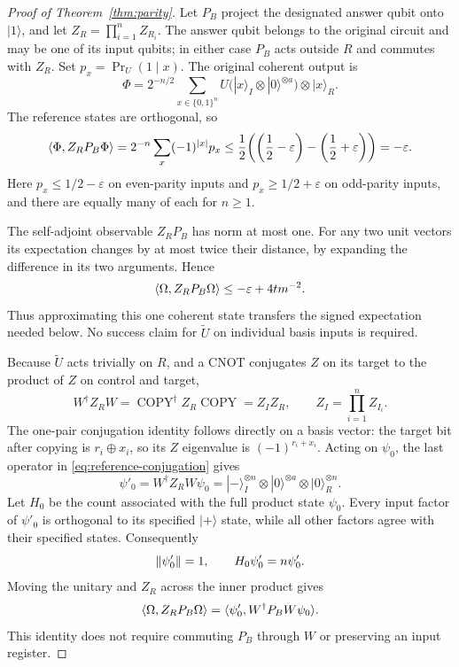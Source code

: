 \begin{proof}[Proof of Theorem~\ref{thm:parity}]
Let $P_B$ project the designated answer qubit onto $|1\rangle$, and
let $Z_R=\prod_{i=1}^n Z_{R_i}$.  The answer qubit belongs to the
original circuit and may be one of its input qubits; in either case
$P_B$ acts outside $R$ and commutes with $Z_R$.  Set
$p_x=\Pr_U(1\mid x)$.  The original coherent output is
\[
 \Phi=2^{-n/2}\sum_{x\in\{0,1\}^n}
        U\bigl(|x\rangle_I\otimes|0\rangle^{\otimes a}\bigr)
        \otimes|x\rangle_R.
\]
The reference states are orthogonal, so
\begin{equation}\label{eq:parity-correlation}
 \langle \Phi,Z_RP_B\Phi\rangle
 =2^{-n}\sum_x(-1)^{|x|}p_x
 \le\frac12\!\left(\left(\frac12-\varepsilon\right)
                  -\left(\frac12+\varepsilon\right)\right)
 =-\varepsilon.
\end{equation}
Here $p_x\le1/2-\varepsilon$ on even-parity inputs and
$p_x\ge1/2+\varepsilon$ on
odd-parity inputs, and there are equally many of each for $n\ge1$.

The self-adjoint observable $Z_RP_B$ has norm at most one.  For any
two unit vectors its expectation changes by at most twice their
distance, by expanding the difference in its two arguments.  Hence
\begin{equation}\label{eq:pruned-correlation}
 \langle \Omega,Z_RP_B\Omega\rangle
 \le-\varepsilon+4t m^{-2}.
\end{equation}
Thus approximating this one coherent state transfers the signed
expectation needed below.  No success claim for $\widetilde U$ on
individual basis inputs is required.

Because $\widetilde U$ acts trivially on $R$, and a CNOT conjugates
$Z$ on its target to the product of $Z$ on control and target,
\begin{equation}\label{eq:reference-conjugation}
 W^{\dagger}Z_RW
 =\operatorname{COPY}^{\dagger}Z_R\operatorname{COPY}
 =Z_I Z_R,
 \qquad Z_I=\prod_{i=1}^n Z_{I_i}.
\end{equation}
The one-pair conjugation identity follows directly on a basis vector:
the target bit after copying is $r_i\mathbin{\oplus}x_i$, so its
$Z$ eigenvalue is $(-1)^{r_i+x_i}$.  Acting on $\psi_0$, the last
operator in \eqref{eq:reference-conjugation} gives
\[
 \psi'_0=W^{\dagger}Z_RW\psi_0
 =|-\rangle_I^{\otimes n}
       \otimes|0\rangle^{\otimes a}
       \otimes|0\rangle_R^{\otimes n}.
\]
Let $H_0$ be the count associated with the full product state
$\psi_0$.  Every input factor of $\psi'_0$ is orthogonal to its
specified $|+\rangle$ state, while all other factors agree with their
specified states.  Consequently
\[
 \lVert\psi'_0\rVert=1,\qquad H_0\psi'_0=n\psi'_0.
\]
Moving the unitary and $Z_R$ across the inner product gives
\begin{equation}\label{eq:parity-pairing}
 \langle \Omega,Z_RP_B\Omega\rangle
 =\langle \psi'_0,W^{\dagger}P_BW\psi_0\rangle.
\end{equation}
This identity does not require commuting $P_B$ through $W$ or
preserving an input register.


\end{proof}
